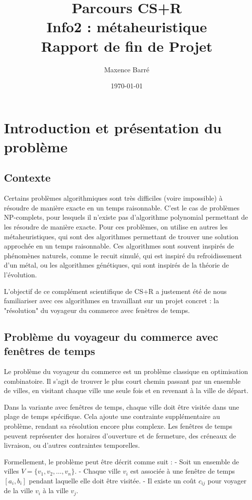 \documentclass[a4paper, 12pt]{article}
\title{Parcours CS+R \\ Info2 : métaheuristique \\ Rapport de fin de Projet}
\author{Maxence Barré}
\date{\today}
\begin{document}
\maketitle

\tableofcontents


\section{Introduction et présentation du problème}
\subsection{Contexte}
Certains problèmes algorithmiques sont très difficiles (voire impossible) à résoudre de manière exacte en un temps raisonnable. 
C'est le cas de problèmes NP-complets, pour lesquels il n'existe pas d'algorithme polynomial permettant de les résoudre de manière exacte. 
Pour ces problèmes, on utilise en autres les métaheuristiques, qui sont des algorithmes permettant de trouver une solution approchée en un temps raisonnable.
Ces algorithmes sont souvent inspirés de phénomènes naturels, comme le recuit simulé, qui est inspiré du refroidissement d'un métal, ou les algorithmes génétiques, qui sont inspirés de la théorie de l'évolution.

L'objectif de ce complément scientifique de CS+R a justement été de nous familiariser avec ces algorithmes en travaillant sur un projet concret : la "résolution" du voyageur du commerce avec fenètres de temps.

\subsection{Problème du voyageur du commerce avec fenêtres de temps}
Le problème du voyageur du commerce est un problème classique en optimisation combinatoire. Il s'agit de trouver le plus court chemin passant par un ensemble de villes, en visitant chaque ville une seule fois et en revenant à la ville de départ. 

Dans la variante avec fenêtres de temps, chaque ville doit être visitée dans une plage de temps spécifique. Cela ajoute une contrainte supplémentaire au problème, rendant sa résolution encore plus complexe. Les fenêtres de temps peuvent représenter des horaires d'ouverture et de fermeture, des créneaux de livraison, ou d'autres contraintes temporelles.

Formellement, le problème peut être décrit comme suit :
- Soit un ensemble de villes $V = \{v_1, v_2, \ldots, v_n\}$.
- Chaque ville $v_i$ est associée à une fenêtre de temps $[a_i, b_i]$ pendant laquelle elle doit être visitée.
- Il existe un coût $c_{ij}$ pour voyager de la ville $v_i$ à la ville $v_j$.
\end{document}

